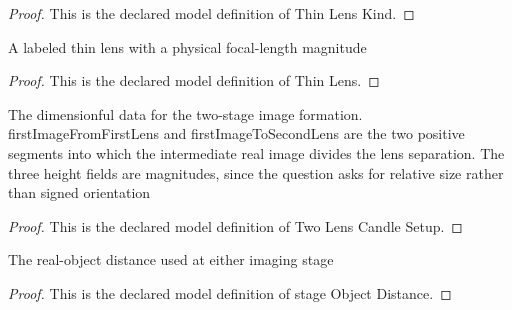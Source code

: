 \begin{proof}
  This is the declared model definition of Thin Lens Kind.
\end{proof}
\begin{definition}
  \label{def:physics:phyx-mini-0144:phyxminiproblems-problemphyxmini0144-thinlens}
  A labeled thin lens with a physical focal-length magnitude
\end{definition}
\begin{proof}
  This is the declared model definition of Thin Lens.
\end{proof}
\begin{definition}
  \label{def:physics:phyx-mini-0144:phyxminiproblems-problemphyxmini0144-twolenscandlesetup}
  The dimensionful data for the two-stage image formation. firstImageFromFirstLens and firstImageToSecondLens are the two positive segments into which the intermediate real image divides the lens separation. The three height fields are magnitudes, since the question asks for relative size rather than signed orientation
\end{definition}
\begin{proof}
  This is the declared model definition of Two Lens Candle Setup.
\end{proof}
\begin{definition}
  \label{def:physics:phyx-mini-0144:phyxminiproblems-problemphyxmini0144-stageobjectdistance}
  The real-object distance used at either imaging stage
\end{definition}
\begin{proof}
  This is the declared model definition of stage Object Distance.
\end{proof}
